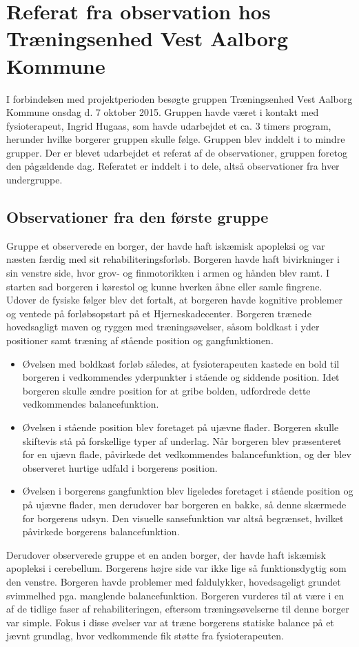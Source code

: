 \chapter{Referat fra observation hos Træningsenhed Vest Aalborg Kommune}\label{Ref_observation}
I forbindelsen med projektperioden besøgte gruppen Træningsenhed Vest Aalborg Kommune onsdag d. 7 oktober 2015. Gruppen havde været i kontakt med fysioterapeut, Ingrid Hugaas, som havde udarbejdet et ca. 3 timers program, herunder hvilke borgerer gruppen skulle følge. Gruppen blev inddelt i to mindre grupper. Der er blevet udarbejdet et referat af de observationer, gruppen foretog den pågældende dag. Referatet er inddelt i to dele, altså observationer fra hver undergruppe. 

\section{Observationer fra den første gruppe}
Gruppe et observerede en borger, der havde haft iskæmisk apopleksi og var næsten færdig med sit rehabiliteringsforløb. Borgeren havde haft bivirkninger i sin venstre side, hvor grov- og finmotorikken i armen og hånden blev ramt. I starten sad borgeren i kørestol og kunne hverken åbne eller samle fingrene. Udover de fysiske følger blev det fortalt, at borgeren havde kognitive problemer og ventede på forløbsopstart på et Hjerneskadecenter. Borgeren trænede hovedsagligt maven og ryggen med træningsøvelser, såsom boldkast i yder positioner samt træning af stående position og gangfunktionen. 
\begin{itemize}
\item Øvelsen med boldkast forløb således, at fysioterapeuten kastede en bold til borgeren i vedkommendes yderpunkter i stående og siddende position. Idet borgeren skulle ændre position for at gribe bolden, udfordrede dette vedkommendes balancefunktion. 
\item Øvelsen i stående position blev foretaget på ujævne flader. Borgeren skulle skiftevis stå på forskellige typer af underlag. Når borgeren blev præsenteret for en ujævn flade, påvirkede det vedkommendes balancefunktion, og der blev observeret hurtige udfald i borgerens position. 
\item Øvelsen i borgerens gangfunktion blev ligeledes foretaget i stående position og på ujævne flader, men derudover bar borgeren en bakke, så denne skærmede for borgerens udsyn. Den visuelle sansefunktion var altså begrænset, hvilket påvirkede borgerens balancefunktion. 
\end{itemize}
\noindent Derudover observerede gruppe et en anden borger, der havde haft iskæmisk apopleksi i cerebellum. Borgerens højre side var ikke lige så funktionsdygtig som den venstre. Borgeren havde problemer med faldulykker, hovedsageligt grundet svimmelhed pga. manglende balancefunktion. Borgeren vurderes til at være i en af de tidlige faser af rehabiliteringen, eftersom træningsøvelserne til denne borger var simple. Fokus i disse øvelser var at træne borgerens statiske balance på et jævnt grundlag, hvor vedkommende fik støtte fra fysioterapeuten. 

